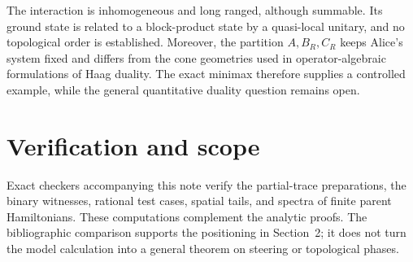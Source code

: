 \documentclass[11pt,a4paper]{article}
\theoremstyle{definition}
\theoremstyle{plain}
\begin{document}
The interaction is inhomogeneous and long ranged, although summable. Its
ground state is related to a block-product state by a quasi-local unitary,
and no topological order is established. Moreover, the partition
$A,B_R,C_R$ keeps Alice's system fixed and differs from the cone geometries
used in operator-algebraic formulations of Haag duality. The exact minimax
therefore supplies a controlled example, while the general quantitative
duality question remains open.

\section{Verification and scope}
Exact checkers accompanying this note verify the partial-trace preparations,
the binary witnesses, rational test cases, spatial tails, and spectra of
finite parent Hamiltonians. These computations complement the analytic
proofs. The bibliographic comparison supports the positioning in
Section~2; it does not turn the model calculation into a general theorem on
steering or topological phases.
\end{document}
